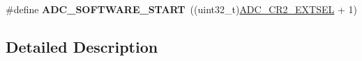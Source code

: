 \begin{DoxyCompactItemize}
\item 
\#define {\bfseries A\+D\+C\+\_\+\+S\+O\+F\+T\+W\+A\+R\+E\+\_\+\+S\+T\+A\+RT}~((uint32\+\_\+t)\hyperlink{group___peripheral___registers___bits___definition_ga6d1054d6cd017e305cf6e8a864ce96c8}{A\+D\+C\+\_\+\+C\+R2\+\_\+\+E\+X\+T\+S\+EL} + 1)\hypertarget{group___a_d_c___external__trigger___source___regular_ga349ec6a1c2a362fba718cbfd068e50dc}{}\label{group___a_d_c___external__trigger___source___regular_ga349ec6a1c2a362fba718cbfd068e50dc}

\end{DoxyCompactItemize}


\subsection{Detailed Description}
